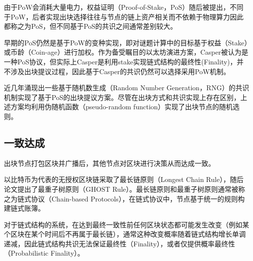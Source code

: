 
由于PoW会消耗大量电力，权益证明（Proof-of-Stake，PoS）随后被提出，不同于PoW，后者实现出块选择往往与节点的链上资产相关而不依赖于物理算力因此都称之为PoS，但不同基于PoS的共识之间通常差别较大。

早期的PoS仍然是基于PoW的变种实现\cite{king2012ppcoin}，即对谜题计算中的目标基于权益（Stake）或币龄（Coin-age）进行加权。作为备受瞩目的以太坊演进方案，Casper\cite{buterin2017casper}被认为是一种PoS协议，但实际上Casper是利用stake实现链式结构的最终性(Finality)，并不涉及出块提议过程，因此基于Casper的共识仍然可以选择采用PoW机制。


近几年涌现出一些基于随机数生成（Random Number Generation，RNG）的共识机制实现了基于PoS的出块提议方案\cite{gilad2017algorand,david2018ouroboros,hanke2018difinity}。尽管在出块方式和共识实现上存在区别，上述方案均利用伪随机函数（pseudo-random function）实现了出块节点的随机选则。


\subsection{一致达成}
\label{subsec:intro_tx_verification}
出块节点打包区块并广播后，其他节点对区块进行决策从而达成一致。

以比特币为代表的无授权区块链采取了最长链原则（Longest Chain Rule）\cite{nakamoto2008bitcoin}，随后论文\cite{sompolinsky2015secure}提出了最重子树原则（GHOST Rule）。最长链原则和最重子树原则通常被称之为链式协议（Chain-based Protocols），在链式协议中，节点基于统一的规则构建链式账簿。

对于链式结构的系统，在达到最终一致性前任何区块状态都可能发生改变（例如某个区块在某个时间后不再属于最长链），通常这种改变概率随着链式结构增长单调递减\cite{nakamoto2008bitcoin}，因此链式结构共识无法保证最终性（Finality），或者仅提供概率最终性（Probabilistic Finality）\cite{wang2019survey}。

